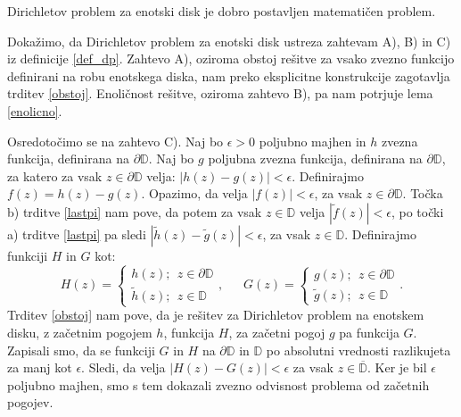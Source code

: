 \documentclass[mat1]{fmfdelo}
\begin{document}
    \begin{posledica}
        Dirichletov problem za enotski disk je dobro postavljen matematičen problem. 
    \end{posledica}
    \begin{dokaz}
        Dokažimo, da Dirichletov problem za enotski disk ustreza zahtevam A), B) in C) iz definicije \ref{def_dp}.
        Zahtevo A), oziroma obstoj rešitve za vsako zvezno funkcijo definirani na robu enotskega diska, nam preko eksplicitne konstrukcije zagotavlja trditev \ref{obstoj}. Enoličnost rešitve, oziroma zahtevo B), pa nam potrjuje lema \ref{enolicno}. 
        
        Osredotočimo se na zahtevo C). 
        Naj bo $\epsilon > 0$ poljubno majhen in $h$ zvezna funkcija, definirana na $\partial \mathbb{D}$. 
        Naj bo $g$ poljubna zvezna funkcija, definirana na $\partial \mathbb{D}$, za katero za vsak $z \in \partial \mathbb{D}$ velja: $|h(z) - g(z)| < \epsilon$. 
        Definirajmo \mbox{$f(z) = h(z) - g(z)$}. Opazimo, da velja $|f(z)| < \epsilon$, za vsak $z \in \partial \mathbb{D}$. Točka b) trditve \ref{lastpi} nam pove, da potem za vsak $z \in \mathbb{D}$ velja $|\widetilde{f}(z)| < \epsilon$, po točki a) trditve \ref{lastpi} pa sledi \mbox{$|\widetilde{h}(z) - \widetilde{g}(z)| < \epsilon$}, za vsak $z \in \mathbb{D}$.
        Definirajmo funkciji $H$ in $G$ kot:
        $$
            H(z) = \begin{cases}
                    h(z);~~z \in \partial \mathbb{D}\\
                    \widetilde{h}(z);~~z \in \mathbb{D}
            \end{cases},~~~~~~~
            G(z) = \begin{cases}
                g(z);~~z \in \partial \mathbb{D}\\
                \widetilde{g}(z);~~z \in \mathbb{D}
            \end{cases}.
        $$
        Trditev \ref{obstoj} nam pove, da je rešitev za Dirichletov problem na enotskem disku, z začetnim pogojem $h$, funkcija $H$, za začetni pogoj $g$ pa funkcija $G$.
        Zapisali smo, da se funkciji $G$ in $H$ na $\partial \mathbb{D}$ in $\mathbb{D}$ po absolutni vrednosti razlikujeta za manj kot $\epsilon$. Sledi, da velja $|H(z) - G(z)| < \epsilon$ za vsak $z \in \overline{\mathbb{D}}$.     
        Ker je bil $\epsilon$ poljubno majhen, smo s tem dokazali zvezno odvisnost problema od začetnih pogojev.
    \end{dokaz}
\end{document}
